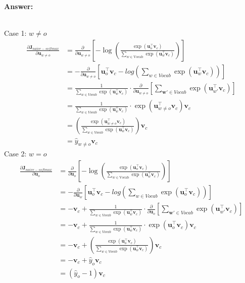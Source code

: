 \documentclass{article}
\newenvironment{answer}{
    {\bf Answer:} \sf \begingroup\color{red}
}{\endgroup}%
\begin{document}
\begin{enumerate}[label=(\alph*)]
\begin{shaded}
\begin{answer}
\\Case 1: $w \neq o$
\begin{align*}
\frac{\partial \bm J_{naive-softmax}}{\partial \bm u_{w \neq o}} 
&= \frac{\partial}{\partial \bm u_{w \neq o}} \left[-\log \left(\frac{\exp(\bm u_o^\top \bm v_c)}{\sum_{w \in \text{Vocab}} \exp(\bm u_{w}^\top \bm v_c)} \right) \right]\\
&= -\frac{\partial}{\partial \bm u_{w \neq o}} \left[\bm u_o^\top \bm v_c -log \left(\sum_{w \in Vocab} \exp(\bm u_w^\top \bm v_c) \right) \right]\\
&= \frac{1}{\sum_{w \in Vocab} \exp(\bm u_w^\top \bm v_c)} \cdot \frac{\partial}{\partial \bm u_{w \neq o}} \left[ \sum_{\bm w' \in Vocab} \exp(\bm u_{w'}^\top \bm v_c) \right]\\
&= \frac{1}{\sum_{w \in Vocab} \exp(\bm u_w^\top \bm v_c)} \cdot \exp(\bm u_{w \neq o}^\top \bm v_c) \bm v_c\\
&= \left( \frac{\exp(\bm u_{w \neq o}^\top \bm v_c)}{\sum_{w \in Vocab} \exp(\bm u_w^\top \bm v_c)}\right) \bm v_c\\
&= \hat{y}_{w \neq o} \bm v_c
\end{align*}
Case 2: $w = o$
\begin{align*}
\frac{\partial \bm J_{naive-softmax}}{\partial \bm u_o} 
&= \frac{\partial}{\partial \bm u_o} \left[-\log \left(\frac{\exp(\bm u_o^\top \bm v_c)}{\sum_{w \in \text{Vocab}} \exp(\bm u_{w}^\top \bm v_c)} \right) \right]\\
&= -\frac{\partial}{\partial \bm u_w} \left[\bm u_o^\top \bm v_c -log \left(\sum_{w \in Vocab} \exp(\bm u_o^\top \bm v_c) \right) \right]\\
&= -\bm v_c + \frac{1}{\sum_{w \in Vocab} \exp(\bm u_w^\top \bm v_c)} \cdot \frac{\partial}{\partial \bm u_o} \left[ \sum_{\bm w' \in Vocab} \exp(\bm u_{w'}^\top \bm v_c) \right]\\
&= -\bm v_c + \frac{1}{\sum_{w \in Vocab} \exp(\bm u_w^\top \bm v_c)} \cdot \exp(\bm u_o^\top \bm v_c) \bm v_c\\
&= -\bm v_c + \left( \frac{\exp(\bm u_o^\top \bm v_c)}{\sum_{w \in Vocab} \exp(\bm u_w^\top \bm v_c)}\right) \bm v_c\\
&= -\bm v_c + \hat{y}_o \bm v_c\\
&= (\hat{y}_o - 1)\bm v_c
\end{align*}
\end{answer}
\end{shaded}


\end{enumerate}
\end{document}
